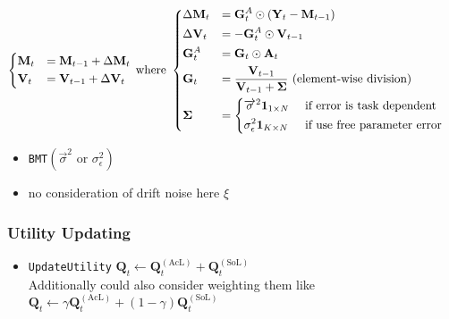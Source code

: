 \documentclass[fleqn]{article}
\begin{document}
\begin{align*}
    \begin{dcases}
        \mathbf{M}_t &=
            \mathbf{M}_{t-1} +
            \Delta \mathbf{M}_t
        \\
        \mathbf{V}_t &=
            \mathbf{V}_{t-1} +
            \Delta \mathbf{V}_t
    \end{dcases}
    & \text{ where }
    \begin{dcases}
        \Delta \mathbf{M}_t &=
            \mathbf{G}^A_t
            \odot
            \left(
                \mathbf{Y}_t
                - \mathbf{M}_{t-1}
            \right)
        \\
        \Delta \mathbf{V}_t &=
            - \mathbf{G}^A_t
            \odot
            \mathbf{V}_{t-1}
        \\
        \mathbf{G}^A_t &=
            \mathbf{G}_t
            \odot
            \mathbf{A}_t
        \\
        \mathbf{G}_t &=
            \dfrac{\mathbf{V}_{t-1}}{\mathbf{V}_{t-1} + \mathbf{\Sigma}}
            \text{ (element-wise division) }
        \\
        \mathbf{\Sigma} &=
            \begin{dcases}
                \overrightarrow{\sigma}^2 \mathbf{1}_{1 \times N}
                    & \text{ if error is task dependent}
                \\
                \sigma_{\epsilon}^2 \mathbf{1}_{K \times N}
                    & \text{ if use free parameter error}
            \end{dcases}
    \end{dcases}
\end{align*}

\begin{itemize}
    \item \texttt{BMT}$
        \left(
            \overrightarrow{\sigma}^2
            \text{ or }
            \sigma^2_{\epsilon}
        \right)$
    \item no consideration of drift noise here $\xi$
\end{itemize}

\subsubsection*{Utility Updating}

\begin{itemize}
    \item \texttt{UpdateUtility} $
        \mathbf{Q}_{t} \leftarrow
        \mathbf{Q}^{\mathrm{(AcL)}}_t +
        \mathbf{Q}^{\mathrm{(SoL)}}_t
        $
        \\
        Additionally could also consider weighting them like
        $
        \mathbf{Q}_{t} \leftarrow
        \gamma \mathbf{Q}^{\mathrm{(AcL)}}_t +
        (1 - \gamma) \mathbf{Q}^{\mathrm{(SoL)}}_t
        $
\end{itemize}
\end{document}
